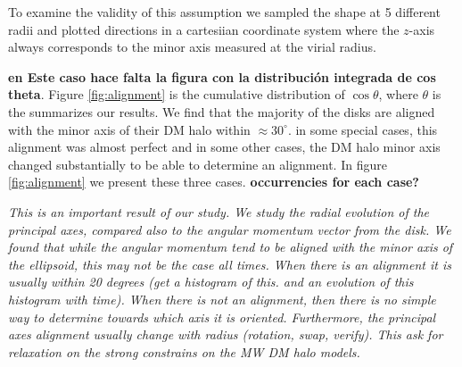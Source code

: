 \documentclass[a4paper,fleqn,usenatbib]{mnras}
\begin{document}
To examine the validity of this assumption  we sampled the shape at 5
different radii and plotted  directions in a cartesiian coordinate
system where the $z$-axis always corresponds to the minor axis
measured at the virial radius.

{\bf en Este caso hace falta la figura con la distribuci\'on integrada de cos theta}.
Figure \ref{fig:alignment} is the cumulative distribution of $\cos\theta$, where $\theta$ is the 
summarizes our results. 
We find that the majority of the disks are aligned with the minor axis of their DM halo within $\approx 30^{\circ}$.
in some special cases, this alignment was almost perfect and in some
other cases, the DM halo minor axis changed substantially to be able
to determine an alignment. In figure \ref{fig:alignment} we present
these three cases. \textbf{occurrencies for each case?} 




\textit{This is an important result of our study. We study the radial
  evolution of the principal axes, compared also to the angular
  momentum vector from the disk. We found that while the angular
  momentum tend to be aligned with the minor axis of the ellipsoid,
  this may not be the case all times. When there is an alignment it is
  usually within 20 degrees (get a histogram of this. and an evolution
  of this histogram with time). When there is not an alignment, then
  there is no simple way to determine towards which axis it is
  oriented. Furthermore, the principal axes alignment usually change
  with radius (rotation, swap, verify). This ask for relaxation on the
  strong constrains on the MW DM halo models.} 
\end{document}
